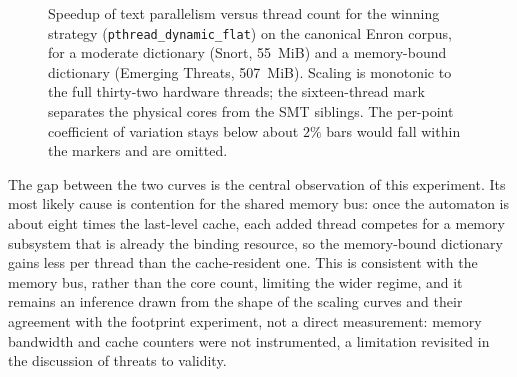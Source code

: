 \begin{figure}[H]
\centering
{}
\caption{Speedup of text parallelism versus thread count for the winning strategy
(\texttt{pthread\_\allowbreak dynamic\_\allowbreak flat}) on the canonical Enron
corpus, for a moderate dictionary (Snort, 55~MiB) and a memory-bound dictionary
(Emerging Threats, 507~MiB). Scaling is monotonic to the full thirty-two hardware
threads; the sixteen-thread mark separates the physical cores from the SMT
siblings. The per-point coefficient of variation stays below about $2\%$
bars would fall within the markers and are omitted.}
\label{fig:speedup}
\end{figure}

The gap between the two curves is the central observation of this experiment. Its
most likely cause is contention for the shared memory bus: once the automaton is
about eight times the last-level cache, each added thread competes for a memory
subsystem that is already the binding resource, so the memory-bound dictionary
gains less per thread than the cache-resident one. This is consistent with the
memory bus, rather than the core count, limiting the wider regime, and it remains
an inference drawn from the shape of the scaling curves and their agreement with
the footprint experiment, not a direct measurement: memory bandwidth and cache
counters were not instrumented, a limitation revisited in the discussion of
threats to validity.

